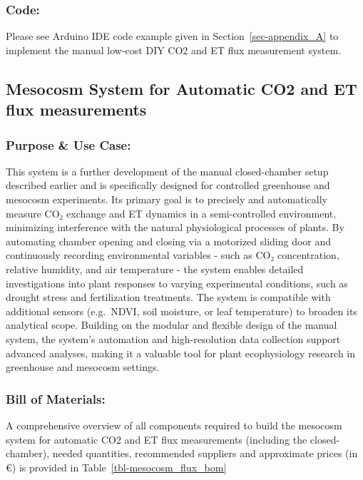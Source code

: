\documentclass[
  11pt,
  letterpaper,
]{book}
\begin{document}
\subsubsection{Code:}\label{sec-manual-flux-code}

Please see Arduino IDE code example given in
Section~\ref{sec-appendix_A} to implement the manual low-cost DIY CO2
and ET flux measurement system.

\subsection{Mesocosm System for Automatic CO2 and ET flux
measurements}\label{sec-mesocosm-flux}

\subsubsection{Purpose \& Use Case:}\label{sec-mesocosm-flux-purpose}

This system is a further development of the manual closed-chamber setup
described earlier and is specifically designed for controlled greenhouse
and mesocosm experiments. Its primary goal is to precisely and
automatically measure CO₂ exchange and ET dynamics in a semi-controlled
environment, minimizing interference with the natural physiological
processes of plants. By automating chamber opening and closing via a
motorized sliding door and continuously recording environmental
variables - such as CO₂ concentration, relative humidity, and air
temperature - the system enables detailed investigations into plant
responses to varying experimental conditions, such as drought stress and
fertilization treatments. The system is compatible with additional
sensors (e.g.~NDVI, soil moisture, or leaf temperature) to broaden its
analytical scope. Building on the modular and flexible design of the
manual system, the system's automation and high-resolution data
collection support advanced analyses, making it a valuable tool for
plant ecophysiology research in greenhouse and mesocosm settings.

\subsubsection{Bill of Materials:}\label{sec-mesocosm-flux-bom}

A comprehensive overview of all components required to build the
mesocosm system for automatic CO2 and ET flux measurements (including
the closed-chamber), needed quantities, recommended suppliers and
approximate prices (in €) is provided in
Table~\ref{tbl-mesocosm_flux_bom}
\end{document}
